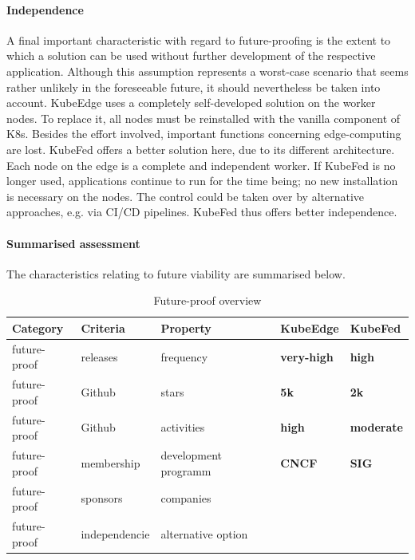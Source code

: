 \documentclass[MIC,Master,english]{twbook}%
\newcommand{\cmark}{\ding{51}}%
\newcommand{\xmark}{\ding{55}}%
\begin{document}
\paragraph{Independence} A final important characteristic with regard to future-proofing is the extent to which a solution can be used without further development of the respective application. Although this assumption represents a worst-case scenario that seems rather unlikely in the foreseeable future, it should nevertheless be taken into account. KubeEdge uses a completely self-developed solution on the worker nodes. To replace it, all nodes must be reinstalled with the vanilla component of \ac{K8s}. Besides the effort involved, important functions concerning edge-computing are lost. \ac{KubeFed} offers a better solution here, due to its different architecture. Each node on the edge is a complete and independent worker. If KubeFed is no longer used, applications continue to run for the time being; no new installation is necessary on the nodes. The control could be taken over by alternative approaches, e.g. via \ac{CI/CD} pipelines. KubeFed thus offers better independence.

\paragraph{Summarised assessment} The characteristics relating to future viability are summarised below.  
\begin{table}[ht]
    \begin{center}
        \begin{tabular}{|l|l|l|l|l|}
            \hline
            Category & Criteria & Property & \textbf{KubeEdge} & \textbf{KubeFed} \\
            \hline
            future-proof & releases & frequency & \textbf{very-high} & \textbf{high} \\
            future-proof & Github & stars & \textbf{5k} & \textbf{2k} \\
            future-proof & Github & activities & \textbf{high} & \textbf{moderate} \\
            future-proof & membership & development programm & \textbf{CNCF} & \textbf{SIG} \\
            future-proof & sponsors & companies & \cmark & \xmark \\
            future-proof & independencie & alternative option & \xmark & \cmark \\
            \hline
        \end{tabular}
        \caption{Future-proof overview}
        \label{tab:fp-overview}
    \end{center}
\end{table}
\end{document}
